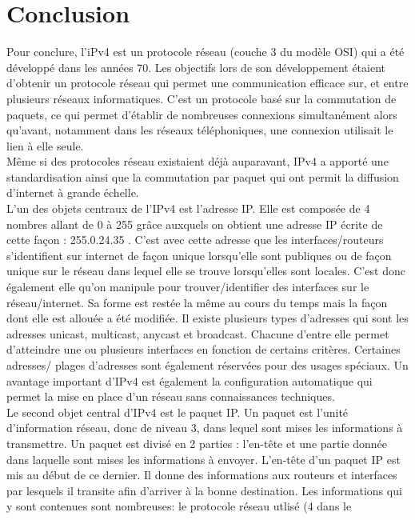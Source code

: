 
\section{Conclusion}

Pour conclure, l'iPv4 est un protocole réseau (couche 3 du modèle OSI) qui
 a été développé dans les années 70. Les objectifs lors de son développement 
étaient d'obtenir un protocole réseau qui permet une communication efficace sur, et entre 
plusieurs réseaux informatiques. C'est un protocole basé sur la commutation de paquets, ce 
qui permet d'établir de nombreuses connexions simultanément alors qu'avant, notamment dans les réseaux téléphoniques, une connexion utilisait le lien à elle seule. 
\\
Même si des protocoles réseau existaient déjà auparavant, IPv4 a apporté une standardisation ainsi
que la commutation par paquet qui ont permit la diffusion d'internet à grande échelle.
\\
L'un des objets centraux de l'IPv4 est l'adresse IP. Elle est composée de 4 nombres allant de 0 à 255 
grâce auxquels on obtient une adresse IP écrite de cette façon : 255.0.24.35 .
C'est avec cette adresse que les interfaces/routeurs s'identifient sur internet de façon unique 
lorsqu'elle sont publiques ou de façon unique sur le réseau dans lequel elle se trouve lorsqu'elles sont locales. 
C'est donc également elle qu'on manipule pour trouver/identifier des interfaces sur le réseau/internet.
 Sa forme est restée la même au cours du temps mais la façon dont elle est allouée a été modifiée.
Il existe plusieurs types d'adresses qui sont les adresses unicast, multicast, anycast et broadcast.
 Chacune d'entre elle permet d'atteindre une ou plusieurs interfaces en fonction de certains
critères. Certaines adresses/ plages d'adresses sont également réservées pour des usages spéciaux. 
Un avantage important d'IPv4 est également la configuration automatique qui permet la mise 
en place d'un réseau sans connaissances techniques.
\\
Le second objet central d'IPv4 est le paquet IP. Un paquet est l'unité d'information réseau, donc 
de niveau 3, dans lequel sont mises les informations à transmettre. Un paquet est divisé en 2 
parties : l'en-tête et une partie donnée dans laquelle sont mises les informations à envoyer.
 L'en-tête d'un paquet IP est mis au début de ce dernier. Il donne des informations aux 
routeurs et interfaces par lesquels il transite afin d'arriver à la bonne destination. Les
 informations qui y sont contenues sont nombreuses: le protocole réseau utlisé (4 dans le
